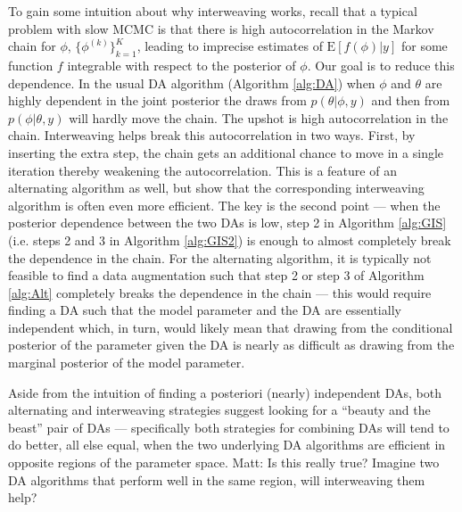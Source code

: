 \documentclass{article}
\newcommand{\matt}[1]{{\color{red} Matt: #1}}
\begin{document}
To gain some intuition about why interweaving works, recall that a typical problem with slow MCMC is that there is high autocorrelation in the Markov chain for $\phi$, $\{\phi^{(k)}\}_{k=1}^K$, leading to imprecise estimates of $\mathrm{E}[f(\phi)|y]$ for some function $f$ integrable with respect to the posterior of $\phi$. Our goal is to reduce this dependence. In the usual DA algorithm (Algorithm \ref{alg:DA}) when $\phi$ and $\theta$ are highly dependent in the joint posterior the draws from $p(\theta|\phi,y)$ and then from $p(\phi|\theta,y)$ will hardly move the chain. The upshot is high autocorrelation in the chain. Interweaving helps break this autocorrelation in two ways. First, by inserting the extra step, the chain gets an additional chance to move in a single iteration thereby weakening the autocorrelation. This is a feature of an alternating algorithm as well, but  show that the corresponding interweaving algorithm is often even more efficient. The key is the second point --- when the posterior dependence between the two DAs is low, step 2 in Algorithm \ref{alg:GIS} (i.e. steps 2 and 3 in Algorithm \ref{alg:GIS2}) is enough to almost completely break the dependence in the chain. For the alternating algorithm, it is typically not feasible to find a data augmentation such that step 2 or step 3 of Algorithm \ref{alg:Alt} completely breaks the dependence in the chain --- this would require finding a DA such that the model parameter and the DA are essentially independent which, in turn, would likely mean that drawing from the conditional posterior of the parameter given the DA is nearly as difficult as drawing from the marginal posterior of the model parameter.
 
Aside from the intuition of finding a posteriori (nearly) independent DAs, both alternating and interweaving strategies suggest looking for a ``beauty and the beast'' pair of DAs --- specifically both strategies for combining DAs will tend to do better, all else equal, when the two underlying DA algorithms are efficient in opposite regions of the parameter space. \matt{Is this really true? Imagine two DA algorithms that perform well in the same region, will interweaving them help?}
\end{document}
